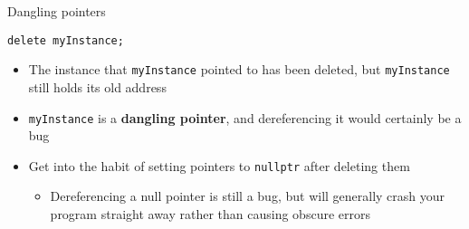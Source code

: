 \begin{frame}[fragile]{Dangling pointers}
    \begin{lstlisting}
delete myInstance;
    \end{lstlisting}
    \begin{itemize}
        \item The instance that \lstinline{myInstance} pointed to has been deleted, but \lstinline{myInstance} still holds its old address
        \item \lstinline{myInstance} is a \textbf{dangling pointer}, and dereferencing it would certainly be a bug
        \item Get into the habit of setting pointers to \lstinline{nullptr} after deleting them
        \begin{itemize}
            \item Dereferencing a null pointer is still a bug, but will generally crash your program straight away rather than causing obscure errors
        \end{itemize}
    \end{itemize}
\end{frame}
